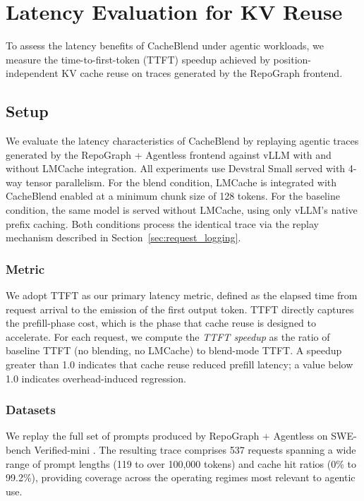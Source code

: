 \section{Latency Evaluation for KV Reuse}
\label{sec:ch2_eval}

To assess the latency benefits of CacheBlend under agentic workloads, we measure the time-to-first-token (TTFT) speedup achieved by position-independent KV cache reuse on traces generated by the RepoGraph frontend.

\subsection{Setup}
We evaluate the latency characteristics of CacheBlend by replaying agentic traces generated by the RepoGraph + Agentless frontend against vLLM with and without LMCache integration. All experiments use Devstral Small served with 4-way tensor parallelism. For the blend condition, LMCache is integrated with CacheBlend enabled at a minimum chunk size of 128 tokens. For the baseline condition, the same model is served without LMCache, using only vLLM's native prefix caching. Both conditions process the identical trace via the replay mechanism described in Section~\ref{sec:request_logging}.

\subsubsection{Metric}
We adopt TTFT as our primary latency metric, defined as the elapsed time from request arrival to the emission of the first output token. TTFT directly captures the prefill-phase cost, which is the phase that cache reuse is designed to accelerate. For each request, we compute the \emph{TTFT speedup} as the ratio of baseline TTFT (no blending, no LMCache) to blend-mode TTFT. A speedup greater than 1.0 indicates that cache reuse reduced prefill latency; a value below 1.0 indicates overhead-induced regression.

\subsubsection{Datasets}

We replay the full set of prompts produced by RepoGraph + Agentless on SWE-bench Verified-mini \cite{MariusHobbhahn2025swe-bench-verified-mini}. The resulting trace comprises 537 requests spanning a wide range of prompt lengths (119 to over 100{,}000 tokens) and cache hit ratios (0\% to 99.2\%), providing coverage across the operating regimes most relevant to agentic use.

